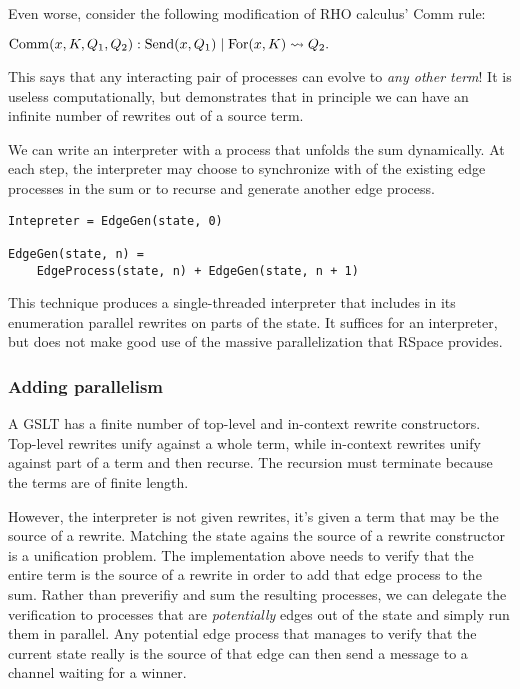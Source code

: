 \documentclass{article}
\begin{document}
Even worse, consider the following modification of RHO calculus' Comm rule: \bigskip

\noindent ${\rm Comm}(x, K, Q_1, Q_2): {\rm Send}(x, Q_1) \;|\; {\rm For}(x, K) \leadsto Q_2.$ \bigskip

\noindent This says that any interacting pair of processes can evolve to {\em any other term}!  It is useless computationally, but demonstrates that in principle we can have an infinite number of rewrites out of a source term.

We can write an interpreter with a process that unfolds the sum dynamically.  At each step, the interpreter may choose to synchronize with of the existing edge processes in the sum or to recurse and generate another edge process.

\begin{verbatim}
Intepreter = EdgeGen(state, 0)

EdgeGen(state, n) =
    EdgeProcess(state, n) + EdgeGen(state, n + 1)
\end{verbatim}

This technique produces a single-threaded interpreter that includes in its enumeration parallel rewrites on parts of the state.  It suffices for an interpreter, but does not make good use of the massive parallelization that RSpace provides.

\subsubsection{Adding parallelism}

A GSLT has a finite number of top-level and in-context rewrite constructors.  Top-level rewrites unify against a whole term, while in-context rewrites unify against part of a term and then recurse.  The recursion must terminate because the terms are of finite length.

However, the interpreter is not given rewrites, it's given a term that may be the source of a rewrite.  Matching the state agains the source of a rewrite constructor is a unification problem.  The implementation above needs to verify that the entire term is the source of a rewrite in order to add that edge process to the sum.  Rather than preverifiy and sum the resulting processes, we can delegate the verification to processes that are {\em potentially} edges out of the state and simply run them in parallel.  Any potential edge process that manages to verify that the current state really is the source of that edge can then send a message to a channel waiting for a winner.
\end{document}
